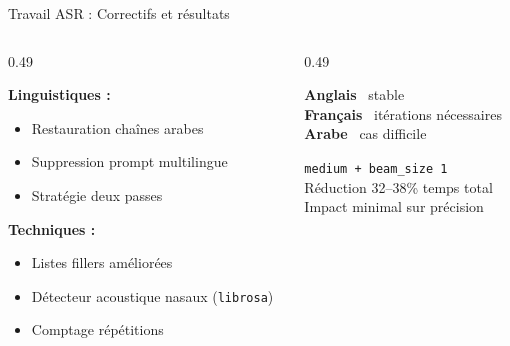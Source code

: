 \documentclass[10pt,aspectratio=169]{beamer}
\newcommand{\cmark}{\textcolor{success}{\ding{51}}}
\begin{document}
\begin{frame}{Travail ASR : Correctifs et résultats}
\begin{columns}[T]
\begin{column}{0.49\textwidth}
\begin{tcolorbox}[title=Correctifs, colframe=primary, colback=primary!3]
\small
\textbf{Linguistiques :}
\begin{itemize}
    \item Restauration chaînes arabes
    \item Suppression prompt multilingue
    \item Stratégie deux passes
\end{itemize}
\textbf{Techniques :}
\begin{itemize}
    \item Listes fillers améliorées
    \item Détecteur acoustique nasaux (\texttt{librosa})
    \item Comptage répétitions
\end{itemize}
\end{tcolorbox}
\end{column}
\begin{column}{0.49\textwidth}
\begin{tcolorbox}[title=Résultats par langue, colframe=success, colback=success!3]
\small
\textbf{Anglais} \cmark~stable\\
\textbf{Français} \cmark~itérations nécessaires\\
\textbf{Arabe} \cmark~cas difficile
\end{tcolorbox}
\begin{tcolorbox}[title=Configuration retenue, colframe=accent, colback=accent!3]
\small
\texttt{medium + beam\_size 1}\\
Réduction 32--38\% temps total\\
Impact minimal sur précision
\end{tcolorbox}
\end{column}
\end{columns}
\end{frame}
\end{document}

